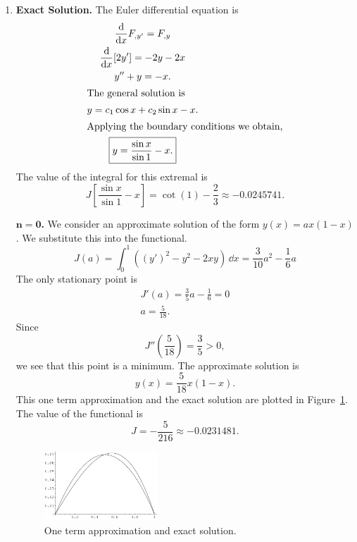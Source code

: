\begin{Solution}
  \begin{enumerate}
  \item
    \textbf{Exact Solution.}
    The Euler differential equation is
    \begin{gather*}
      \frac{\mathrm{d}}{\mathrm{d} x} F_{,y'} = F_{,y} \\
      \frac{\mathrm{d}}{\mathrm{d} x} [2 y'] = -2 y - 2 x \\
      y'' + y = - x. \\
      \intertext{The general solution is}
      y = c_1 \cos x + c_2 \sin x - x. \\
      \intertext{Applying the boundary conditions we obtain,}
      \boxed{
        y = \frac{\sin x}{\sin 1} - x.
        } 
    \end{gather*}
    The value of the integral for this extremal is
    \[
    \boxed{
      J \left[ \frac{\sin x}{\sin 1} - x \right]
      = \cot(1) - \frac{2}{3} 
      \approx -0.0245741.
      }
    \]




    \textbf{$\mathbf{n \boldsymbol{=} 0}$.}
    We consider an approximate solution of the form $y(x) = a x (1-x)$.  We 
    substitute this into the functional.
    \[
    J(a) = \int_0^1 \left( (y')^2 - y^2 - 2 x y \right) \,\dd x  
    = \frac{3}{10} a^2 - \frac{1}{6} a 
    \]
    The only stationary point is
    \begin{gather*}
      J'(a) = \frac{3}{5} a - \frac{1}{6} = 0 \\
      a = \frac{5}{18}.
    \end{gather*}
    Since
    \[
    J''\left( \frac{5}{18} \right) = \frac{3}{5} > 0,
    \]
    we see that this point is a minimum.
    The approximate solution is
    \[
    \boxed{
      y(x) = \frac{5}{18} x (1-x).
      }
    \]
    This one term approximation and the exact solution are plotted in 
    Figure~\ref{p1_1t}.  The value of the functional is
    \[
    \boxed{
      J = - \frac{5}{216} \approx -0.0231481.
      }
    \]

    \begin{figure}[h!]
      \begin{center}
        \includegraphics[width=0.4\textwidth]{cv/cv/p1_1t}
      \end{center}
      \caption{One term approximation and exact solution.}
      \label{p1_1t}
    \end{figure}






\end{enumerate}
\end{Solution}
